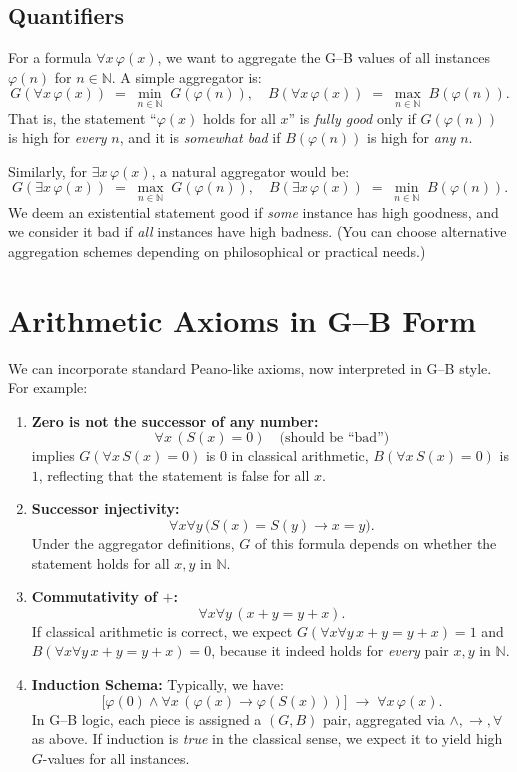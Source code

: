 \documentclass[11pt]{article}
\begin{document}
\subsection{Quantifiers}

For a formula $\forall x\, \varphi(x)$, we want to aggregate the G--B values of all 
instances $\varphi(n)$ for $n \in \mathbb{N}$. A simple aggregator is:
\[
  G(\forall x\, \varphi(x)) \;=\; 
   \min_{n \in \mathbb{N}} \; G(\varphi(n)),
  \quad
  B(\forall x\, \varphi(x)) \;=\;
   \max_{n \in \mathbb{N}} \; B(\varphi(n)).
\]
That is, the statement ``$\varphi(x)$ holds for all $x$'' is \emph{fully good} 
only if $G(\varphi(n))$ is high for \emph{every} $n$, 
and it is \emph{somewhat bad} if $B(\varphi(n))$ is high for \emph{any} $n$. 

Similarly, for $\exists x\, \varphi(x)$, a natural aggregator would be:
\[
  G(\exists x\, \varphi(x)) \;=\; 
   \max_{n \in \mathbb{N}} \; G(\varphi(n)),
  \quad
  B(\exists x\, \varphi(x)) \;=\;
   \min_{n \in \mathbb{N}} \; B(\varphi(n)).
\]
We deem an existential statement good if \emph{some} instance has high goodness, 
and we consider it bad if \emph{all} instances have high badness. 
(You can choose alternative aggregation schemes depending on philosophical or practical needs.)

\section{Arithmetic Axioms in G--B Form}

We can incorporate standard Peano-like axioms, now interpreted in G--B style. For example:

\begin{enumerate}
  \item \textbf{Zero is not the successor of any number:} 
  \[
    \forall x\, (S(x) = 0) \quad \text{(should be ``bad'')} 
  \]
  implies $G(\forall x\, S(x)=0)$ is $0$ in classical arithmetic, 
  $B(\forall x\, S(x)=0)$ is $1$, reflecting that the statement is false for all $x$.

  \item \textbf{Successor injectivity:} 
  \[
    \forall x \forall y\, \bigl( S(x)=S(y) \to x=y \bigr).
  \]
  Under the aggregator definitions, $G$ of this formula depends on 
  whether the statement holds for all $x,y$ in $\mathbb{N}$.

  \item \textbf{Commutativity of $+$:}
  \[
    \forall x \forall y\, (x + y = y + x).
  \]
  If classical arithmetic is correct, we expect $G(\forall x\forall y\, x+y=y+x)=1$ 
  and $B(\forall x\forall y\, x+y=y+x)=0$, 
  because it indeed holds for \emph{every} pair $x,y$ in $\mathbb{N}$.

  \item \textbf{Induction Schema:}
  Typically, we have:
  \[
    \bigl[\varphi(0) \land \forall x\,(\varphi(x)\to \varphi(S(x)))\bigr]
    \;\to\; \forall x\, \varphi(x).
  \]
  In G--B logic, each piece is assigned a $(G,B)$ pair, 
  aggregated via $\land,\to,\forall$ as above. 
  If induction is \emph{true} in the classical sense, we expect it to yield 
  high $G$-values for all instances.
\end{enumerate}
\end{document}
